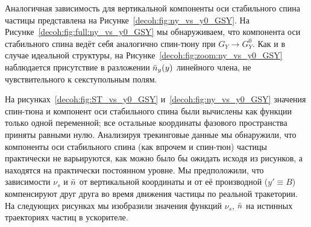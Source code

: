 Аналогичная зависимость для вертикальной компоненты оси стабильного спина частицы представлена на Рисунке~\ref{decoh:fig:ny_vs_y0_GSY}. На Рисунке~\ref{decoh:fig:full:ny_vs_y0_GSY} мы обнаруживаем, что компонента оси стабильного спина ведёт себя аналогично спин-тюну при $G_Y \rightarrow G_Y^0$. Как и в случае идеальной структуры, на Рисунке~\ref{decoh:fig:zoom:ny_vs_y0_GSY} наблюдается присутствие в разложении $\bar n_y(y)$ линейного члена, не чувствительного к секступольным полям.

На рисунках~\ref{decoh:fig:ST_vs_y0_GSY} и~\ref{decoh:fig:ny_vs_y0_GSY} значения спин-тюна и компонент оси стабильного спина были вычислены как функции только одной переменной; все остальные координаты фазового пространства приняты равными нулю. Анализируя трекинговые данные мы обнаружили, что компоненты оси стабильного спина (как впрочем и спин-тюн) частицы практически не варьируются, как можно было бы ожидать исходя из рисунков, а находятся на практически постоянном уровне. Мы предположили, что зависимости $\nu_s$ и $\bar n$ от вертикальной координаты и от её производной (${y'\equiv B}$) компенсируют друг друга во время движения частицы по реальной тракетории. На следующих рисунках мы изобразили значения функций $\nu_s$, $\bar n$ на истинных траекториях частиц в ускорителе.

